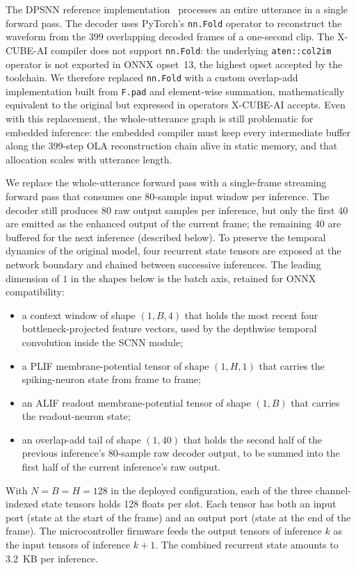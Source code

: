 \documentclass[conference]{IEEEtran}
\begin{document}
The DPSNN reference implementation~\cite{b4} processes an
entire utterance in a single forward pass. The decoder uses PyTorch's \texttt{nn.Fold} operator to reconstruct the waveform from the 399 overlapping decoded frames of a one-second clip. The X-CUBE-AI compiler does not support \texttt{nn.Fold}: the underlying \texttt{aten::col2im} operator is not exported in ONNX opset~13, the highest opset accepted by the toolchain. We therefore replaced \texttt{nn.Fold} with a custom overlap-add implementation built from \texttt{F.pad} and element-wise summation, mathematically equivalent to the original but expressed in operators X-CUBE-AI accepts. Even with this replacement, the whole-utterance graph is still problematic for embedded inference: the embedded compiler must keep every intermediate buffer along the 399-step OLA reconstruction chain alive in static memory, and that allocation scales with utterance length.


We replace the whole-utterance forward pass with a single-frame streaming forward pass that consumes one 80-sample input window per inference. The decoder still produces 80 raw output samples per inference, but only the first 40 are emitted as the enhanced output of the current frame; the remaining 40 are buffered for the next inference (described below). To preserve the temporal dynamics of the original model, four recurrent state tensors are exposed at the network boundary and chained between successive inferences. The leading dimension of $1$ in the shapes below is the batch axis, retained for ONNX compatibility:


\begin{itemize}
\item a context window of shape $(1, B, 4)$ that holds the most recent four bottleneck-projected feature vectors, used by the depthwise temporal convolution inside the SCNN module;
\item a PLIF membrane-potential tensor of shape $(1, H, 1)$ that carries the spiking-neuron state from frame to frame;
\item an ALIF readout membrane-potential tensor of shape $(1, B)$ that carries the readout-neuron state;
\item an overlap-add tail of shape $(1, 40)$ that holds the second half of the previous inference's 80-sample raw decoder output, to be summed into the first half of the current inference's raw output.
\end{itemize}

With $N=B=H=128$ in the deployed configuration, each of the three channel-indexed state tensors holds 128 floats per slot. Each tensor has both an input port (state at the start of the frame) and an output port (state at the end of the frame). The microcontroller firmware feeds the output tensors of inference $k$ as the input tensors of inference $k+1$. The combined recurrent state amounts to 3.2~KB per inference.
\end{document}
